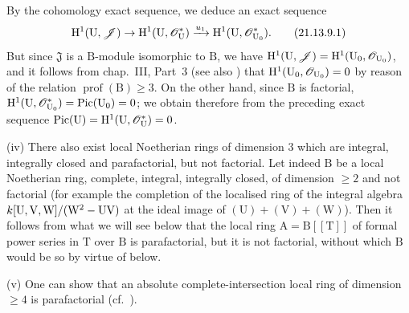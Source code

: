 \begin{env}[21.13.9]
By the cohomology exact sequence, we deduce an exact sequence
\[
\label{IV.21.13.9.1}
  \mathrm{H}^1(\mathrm{U},\mathscr{J})\to\mathrm{H}^1(\mathrm{U},\mathscr{O}_{\mathrm{U}}^*)\xrightarrow{u_1}\mathrm{H}^1(\mathrm{U},\mathscr{O}_{\mathrm{U}_0}^*).
  \tag{21.13.9.1}
\]
But since $\mathfrak{J}$ is a $\mathrm{B}$-module isomorphic to $\mathrm{B}$, we have $\mathrm{H}^1(\mathrm{U},\mathscr{J})=\mathrm{H}^1(\mathrm{U}_0,\mathscr{O}_{\mathrm{U}_0})$, and it follows from chap.~III, Part~3 (see also \cite[III, Example~III-1]{IV-41}) that
$\mathrm{H}^1(\mathrm{U}_0,\mathscr{O}_{\mathrm{U}_0})=0$ by reason of the relation $\operatorname{prof}(\mathrm{B})\geq 3$.
On the other hand, since $\mathrm{B}$ is factorial, $\mathrm{H}^1(\mathrm{U},\mathscr{O}_{\mathrm{U}_0}^*)=\operatorname{Pic}(\mathrm{U}_0)=0$; we obtain therefore from the preceding exact sequence $\operatorname{Pic}(\mathrm{U})=\mathrm{H}^1(\mathrm{U},\mathscr{O}_{\mathrm{U}}^*)=0$.

(iv) There also exist local Noetherian rings of dimension $3$ which are integral, integrally closed and parafactorial, but not factorial.
Let indeed $\mathrm{B}$ be a local Noetherian ring, complete, integral, integrally closed, of dimension $\geq 2$ and not factorial (for example the completion of the localised ring of the integral algebra $k[\mathrm{U},\mathrm{V},\mathrm{W}]/(\mathrm{W}^2-\mathrm{U}\mathrm{V})$ at the ideal image of $(\mathrm{U})+(\mathrm{V})+(\mathrm{W})$).
Then it follows from what we will see below  that the local ring $\mathrm{A}=\mathrm{B}[[\mathrm{T}]]$ of formal power series in $\mathrm{T}$ over $\mathrm{B}$ is parafactorial, but it is not factorial, without which $\mathrm{B}$ would be so by virtue of  below.

(v) One can show that an absolute complete-intersection local ring  of dimension $\geq 4$ is parafactorial (cf.\ \cite[XI, $3.13$~(i)]{IV-41}).


\end{env}
